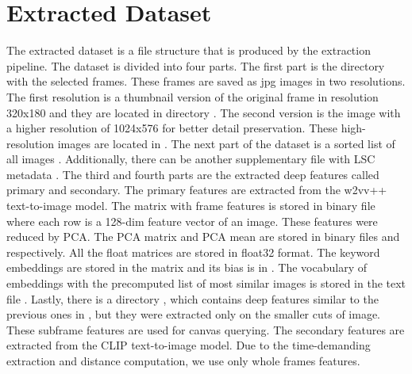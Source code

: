 \chapter{Extracted Dataset}
\label{extracted-dataset}


The extracted dataset is a file structure that is produced by the extraction pipeline. The dataset is divided into four parts. The first part is the directory  with the selected frames. These frames are saved as jpg images in two resolutions. The first resolution is a thumbnail version of the original frame in resolution 320x180 and they are located in directory . The second version is the image with a higher resolution of 1024x576 for better detail preservation. These high-resolution images are located in . The next part of the dataset is a sorted list of all images . Additionally, there can be another supplementary file with LSC metadata . The third and fourth parts are the extracted deep features called primary and secondary. The primary features are extracted from the w2vv++ text-to-image model. The matrix with frame features is stored in binary file  where each row is a 128-dim feature vector of an image. These features were reduced by PCA. The PCA matrix and PCA mean are stored in binary files  and  respectively. All the float matrices are stored in float32 format. The keyword embeddings are stored in the matrix  and its bias is in . The vocabulary of embeddings with the precomputed list of most similar images is stored in the text file . Lastly, there is a directory , which contains deep features similar to the previous ones in , but they were extracted only on the smaller cuts of image. These subframe features are used for canvas querying. The secondary features are extracted from the CLIP text-to-image model. Due to the time-demanding extraction and distance computation, we use only whole frames features. 

